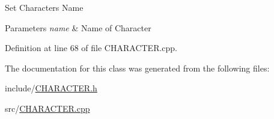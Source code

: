 Set Character\textquotesingle{}s Name 


\begin{DoxyParams}{Parameters}
{\em name} & Name of Character\\
\hline
\end{DoxyParams}


Definition at line 68 of file C\+H\+A\+R\+A\+C\+T\+E\+R.\+cpp.



The documentation for this class was generated from the following files\+:\begin{DoxyCompactItemize}
\item 
include/\mbox{\hyperlink{_c_h_a_r_a_c_t_e_r_8h}{C\+H\+A\+R\+A\+C\+T\+E\+R.\+h}}\item 
src/\mbox{\hyperlink{_c_h_a_r_a_c_t_e_r_8cpp}{C\+H\+A\+R\+A\+C\+T\+E\+R.\+cpp}}\end{DoxyCompactItemize}
